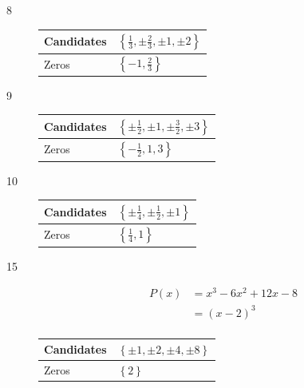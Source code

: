 \documentclass{exam}
\begin{document}
\begin{description}
      \item[8]

        \begin{tabular}{ll}
          \toprule
          Candidates & $\left\{ \frac{1}{3}, \pm \frac{2}{3}, \pm 1, \pm 2 \right\}$ \\
          \midrule
          Zeros      & $\left\{ -1, \frac{2}{3} \right\}$ \\
          \bottomrule
        \end{tabular}

        \vspace{.5 cm}

      \item[9]
        \begin{tabular}{ll}
          \toprule
          Candidates & $\left\{ \pm \frac{1}{2}, \pm 1, \pm \frac{3}{2}, \pm 3 \right\}$ \\
          \midrule
          Zeros      & $\left\{ -\frac{1}{2}, 1, 3 \right\}$ \\
          \bottomrule
        \end{tabular}

        \vspace{.5 cm}

      \item[10]
        \begin{tabular}{ll}
          \toprule
          Candidates & $\left\{ \pm \frac{1}{4}, \pm \frac{1}{2}, \pm 1 \right\}$ \\
          \midrule
          Zeros      & $\left\{ \frac{1}{4}, 1 \right\}$ \\
          \bottomrule
        \end{tabular}

        \vspace{.5 cm}

      \item[15]
        \begin{align*}
          P(x) &= x^3 - 6x^2 +12x - 8 \\
               &= (x - 2)^3 \\
        \end{align*}

        \begin{tabular}{ll}
          \toprule
          Candidates & $\left\{ \pm 1, \pm  2, \pm  4, \pm  8 \right\}$ \\
          \midrule
          Zeros      & $\left\{ 2 \right\}$ \\
          \bottomrule
        \end{tabular}


\end{description}
\end{document}
